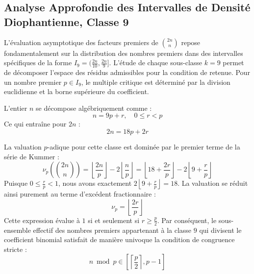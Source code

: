 \documentclass[12pt,a4paper]{article}
\begin{document}
    \newpage
    \subsection{Analyse Approfondie des Intervalles de Densité Diophantienne, Classe 9}
    L'évaluation asymptotique des facteurs premiers de $\binom{2n}{n}$ repose fondamentalement sur la distribution des nombres premiers dans des intervalles spécifiques de la forme $I_9 = (\frac{2n}{10}, \frac{2n}{9}]$.
    L'étude de chaque sous-classe $k = 9$ permet de décomposer l'espace des résidus admissibles pour la condition de retenue.
    Pour un nombre premier $p \in I_9$, le multiple critique est déterminé par la division euclidienne et la borne supérieure du coefficient.

    L'entier $n$ se décompose algébriquement comme :
    \begin{equation}
    n = 9 p + r, \quad 0 \le r < p
    \end{equation}
    Ce qui entraîne pour $2n$ :
    \begin{equation}
    2n = 18 p + 2r
    \end{equation}

    La valuation $p$-adique pour cette classe est dominée par le premier terme de la série de Kummer :
    \begin{equation}
    \nu_p\left( \binom{2n}{n} \right) = \left\lfloor \frac{2n}{p} \right\rfloor - 2 \left\lfloor \frac{n}{p} \right\rfloor = \left\lfloor 18 + \frac{2r}{p} \right\rfloor - 2 \left\lfloor 9 + \frac{r}{p} \right\rfloor
    \end{equation}
    Puisque $0 \le \frac{r}{p} < 1$, nous avons exactement $2 \left\lfloor 9 + \frac{r}{p} \right\rfloor = 18$.
    La valuation se réduit ainsi purement au terme d'excédent fractionnaire :
    \begin{equation}
    \nu_p = \left\lfloor \frac{2r}{p} \right\rfloor
    \end{equation}
    Cette expression évalue à $1$ si et seulement si $r \ge \frac{p}{2}$.
    Par conséquent, le sous-ensemble effectif des nombres premiers appartenant à la classe $9$ qui divisent le coefficient binomial satisfait de manière univoque la condition de congruence stricte :
    \begin{equation}
    n \bmod p \in \left[ \left\lceil \frac{p}{2} \right\rceil, p - 1 \right]
    \end{equation}
\end{document}
